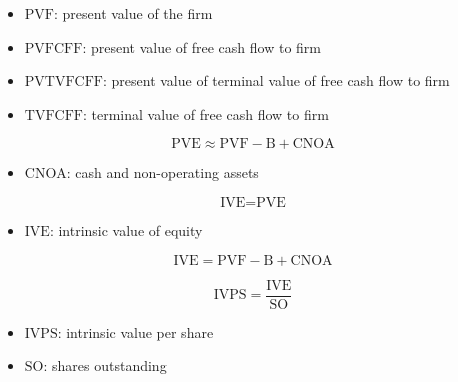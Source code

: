 \begin{itemize}
  \item[] $\text{PVF}$: present value of the firm
  \item[] $\text{PVFCFF}$: present value of free cash flow to firm
  \item[] $\text{PVTVFCFF}$: present value of terminal value of free cash flow to firm
  \item[] $\text{TVFCFF}$: terminal value of free cash flow to firm
\end{itemize}

$$
\text{PVE} \approx \text{PVF} - \text{B} + \text{CNOA}
$$

\begin{itemize}
  \item[] $\text{CNOA}$: cash and non-operating assets
\end{itemize}

$$
\text{IVE} = \text{PVE}
$$

\begin{itemize}
  \item[] $\text{IVE}$: intrinsic value of equity
\end{itemize}

$$
\text{IVE} = \text{PVF} - \text{B} + \text{CNOA}
$$

$$
\text{IVPS} = \frac{\text{IVE}}{\text{SO}}
$$

\begin{itemize}
  \item[] $\text{IVPS}$: intrinsic value per share
  \item[] $\text{SO}$: shares outstanding
\end{itemize}
